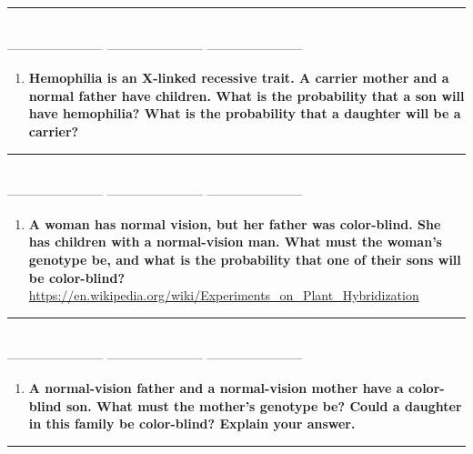 \documentclass[
  letterpaper,
  DIV=11,
  numbers=noendperiod]{scrreprt}
\providecommand{\tightlist}{%
  \setlength{\itemsep}{0pt}\setlength{\parskip}{0pt}}
\begin{document}
\begin{center}\rule{0.5\linewidth}{0.5pt}\end{center}

\textbf{~~}\\
----------------------- ----------------------- -----------------------

\begin{enumerate}
\def\labelenumi{\arabic{enumi}.}
\setcounter{enumi}{2}
\tightlist
\item
  \textbf{Hemophilia is an X-linked recessive trait. A carrier mother
  and a normal father have children. What is the probability that a son
  will have hemophilia? What is the probability that a daughter will be
  a carrier?}
\end{enumerate}

\begin{center}\rule{0.5\linewidth}{0.5pt}\end{center}

\textbf{~~}\\
----------------------- ----------------------- -----------------------

\begin{enumerate}
\def\labelenumi{\arabic{enumi}.}
\setcounter{enumi}{3}
\tightlist
\item
  \textbf{A woman has normal vision, but her father was color-blind. She
  has children with a normal-vision man. What must the woman's genotype
  be, and what is the probability that one of their sons will be
  color-blind?}
  \url{https://en.wikipedia.org/wiki/Experiments_on_Plant_Hybridization}
\end{enumerate}

\begin{center}\rule{0.5\linewidth}{0.5pt}\end{center}

\textbf{~~}\\
----------------------- ----------------------- -----------------------

\begin{enumerate}
\def\labelenumi{\arabic{enumi}.}
\setcounter{enumi}{4}
\tightlist
\item
  \textbf{A normal-vision father and a normal-vision mother have a
  color-blind son. What must the mother's genotype be? Could a daughter
  in this family be color-blind? Explain your answer.}
\end{enumerate}

\begin{center}\rule{0.5\linewidth}{0.5pt}\end{center}
\end{document}
